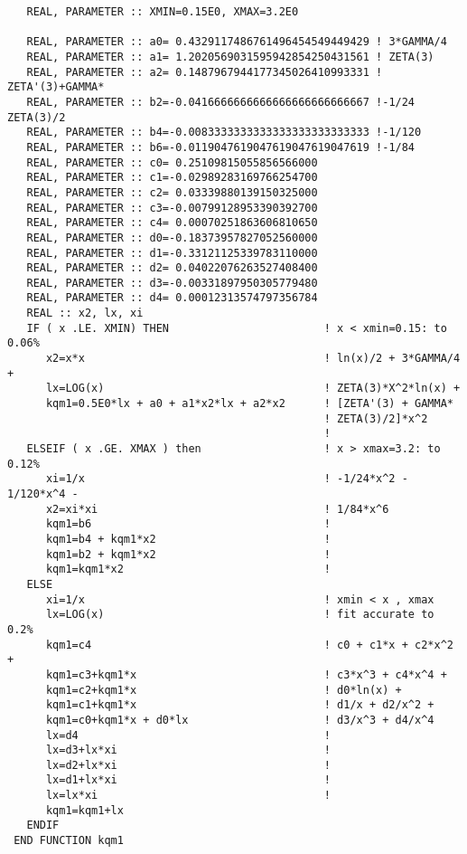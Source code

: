 \documentclass[preprint,12pt,eqsecnum,nofootinbib,amsmath,amssymb]{revtex4}
\begin{document}
{\begin{verbatim}
   REAL, PARAMETER :: XMIN=0.15E0, XMAX=3.2E0 

   REAL, PARAMETER :: a0= 0.4329117486761496454549449429 ! 3*GAMMA/4
   REAL, PARAMETER :: a1= 1.2020569031595942854250431561 ! ZETA(3)
   REAL, PARAMETER :: a2= 0.1487967944177345026410993331 ! ZETA'(3)+GAMMA*
   REAL, PARAMETER :: b2=-0.0416666666666666666666666667 !-1/24  ZETA(3)/2
   REAL, PARAMETER :: b4=-0.0083333333333333333333333333 !-1/120
   REAL, PARAMETER :: b6=-0.0119047619047619047619047619 !-1/84
   REAL, PARAMETER :: c0= 0.25109815055856566000
   REAL, PARAMETER :: c1=-0.02989283169766254700
   REAL, PARAMETER :: c2= 0.03339880139150325000
   REAL, PARAMETER :: c3=-0.00799128953390392700
   REAL, PARAMETER :: c4= 0.00070251863606810650
   REAL, PARAMETER :: d0=-0.18373957827052560000
   REAL, PARAMETER :: d1=-0.33121125339783110000
   REAL, PARAMETER :: d2= 0.04022076263527408400
   REAL, PARAMETER :: d3=-0.00331897950305779480
   REAL, PARAMETER :: d4= 0.00012313574797356784
   REAL :: x2, lx, xi
   IF ( x .LE. XMIN) THEN                        ! x < xmin=0.15: to 0.06%
      x2=x*x                                     ! ln(x)/2 + 3*GAMMA/4 +
      lx=LOG(x)                                  ! ZETA(3)*X^2*ln(x) +
      kqm1=0.5E0*lx + a0 + a1*x2*lx + a2*x2      ! [ZETA'(3) + GAMMA*
                                                 ! ZETA(3)/2]*x^2
                                                 !
   ELSEIF ( x .GE. XMAX ) then                   ! x > xmax=3.2: to 0.12%
      xi=1/x                                     ! -1/24*x^2 - 1/120*x^4 -
      x2=xi*xi                                   ! 1/84*x^6
      kqm1=b6                                    !
      kqm1=b4 + kqm1*x2                          !
      kqm1=b2 + kqm1*x2                          !
      kqm1=kqm1*x2                               !
   ELSE
      xi=1/x                                     ! xmin < x , xmax
      lx=LOG(x)                                  ! fit accurate to 0.2%
      kqm1=c4                                    ! c0 + c1*x + c2*x^2 +
      kqm1=c3+kqm1*x                             ! c3*x^3 + c4*x^4 +
      kqm1=c2+kqm1*x                             ! d0*ln(x) +
      kqm1=c1+kqm1*x                             ! d1/x + d2/x^2 +
      kqm1=c0+kqm1*x + d0*lx                     ! d3/x^3 + d4/x^4
      lx=d4                                      !
      lx=d3+lx*xi                                !
      lx=d2+lx*xi                                !
      lx=d1+lx*xi                                !
      lx=lx*xi                                   !
      kqm1=kqm1+lx
   ENDIF
 END FUNCTION kqm1


\end{verbatim}}
\end{document}
